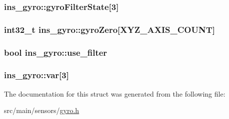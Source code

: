 \hypertarget{structins__gyro_a5d5828ee7a233007d5d302e91579d708}{
\subsubsection[{gyro\+Filter\+State}]{ ins\+\_\+gyro\+::gyro\+Filter\+State\mbox{[}3\mbox{]}}}\label{structins__gyro_a5d5828ee7a233007d5d302e91579d708}
\hypertarget{structins__gyro_a623737e0c5e68b9f38d4cb324910ed0f}{
\subsubsection[{gyro\+Zero}]{\setlength{\rightskip}{0pt plus 5cm}int32\+\_\+t ins\+\_\+gyro\+::gyro\+Zero\mbox{[}{\bf X\+Y\+Z\+\_\+\+A\+X\+I\+S\+\_\+\+C\+O\+U\+N\+T}\mbox{]}}}\label{structins__gyro_a623737e0c5e68b9f38d4cb324910ed0f}
\hypertarget{structins__gyro_a63337c4f06341f6c4d67b939d5dcc33d}{
\subsubsection[{use\+\_\+filter}]{\setlength{\rightskip}{0pt plus 5cm}bool ins\+\_\+gyro\+::use\+\_\+filter}}\label{structins__gyro_a63337c4f06341f6c4d67b939d5dcc33d}
\hypertarget{structins__gyro_ac95458826f5de85774e6d946774cf2b3}{
\subsubsection[{var}]{ ins\+\_\+gyro\+::var\mbox{[}3\mbox{]}}}\label{structins__gyro_ac95458826f5de85774e6d946774cf2b3}


The documentation for this struct was generated from the following file\+:\begin{DoxyCompactItemize}
\item 
src/main/sensors/\hyperlink{sensors_2gyro_8h}{gyro.\+h}\end{DoxyCompactItemize}
